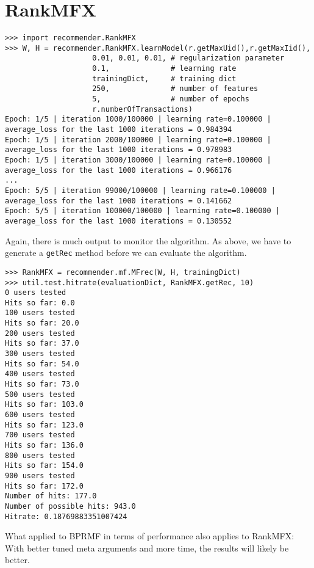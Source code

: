 \section{RankMFX}
\begin{lstlisting}[style=python]
>>> import recommender.RankMFX
>>> W, H = recommender.RankMFX.learnModel(r.getMaxUid(),r.getMaxIid(),
                    0.01, 0.01, 0.01, # regularization parameter
                    0.1,              # learning rate
                    trainingDict,     # training dict
                    250,              # number of features
                    5,                # number of epochs
                    r.numberOfTransactions)
Epoch: 1/5 | iteration 1000/100000 | learning rate=0.100000 | average_loss for the last 1000 iterations = 0.984394
Epoch: 1/5 | iteration 2000/100000 | learning rate=0.100000 | average_loss for the last 1000 iterations = 0.978983
Epoch: 1/5 | iteration 3000/100000 | learning rate=0.100000 | average_loss for the last 1000 iterations = 0.966176
...
Epoch: 5/5 | iteration 99000/100000 | learning rate=0.100000 | average_loss for the last 1000 iterations = 0.141662
Epoch: 5/5 | iteration 100000/100000 | learning rate=0.100000 | average_loss for the last 1000 iterations = 0.130552
\end{lstlisting}
Again, there is much output to monitor the algorithm.
As above, we have to generate a \lstinline!getRec! method before we can evaluate the algorithm.
\begin{lstlisting}[style=python]
>>> RankMFX = recommender.mf.MFrec(W, H, trainingDict)
>>> util.test.hitrate(evaluationDict, RankMFX.getRec, 10)
0 users tested
Hits so far: 0.0
100 users tested
Hits so far: 20.0
200 users tested
Hits so far: 37.0
300 users tested
Hits so far: 54.0
400 users tested
Hits so far: 73.0
500 users tested
Hits so far: 103.0
600 users tested
Hits so far: 123.0
700 users tested
Hits so far: 136.0
800 users tested
Hits so far: 154.0
900 users tested
Hits so far: 172.0
Number of hits: 177.0
Number of possible hits: 943.0
Hitrate: 0.18769883351007424
\end{lstlisting}
What applied to BPRMF in terms of performance also applies to RankMFX:
With better tuned meta arguments and more time, the results will likely
be better.


